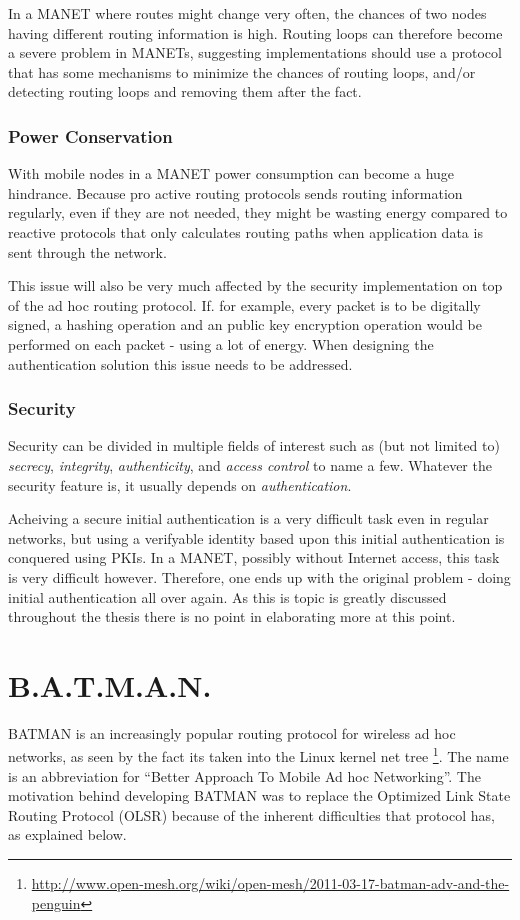 In a \ac{MANET} where routes might change very often, the chances of two nodes
having different routing information is high. Routing loops can therefore become
a severe problem in \acp{MANET}, suggesting implementations should use a
protocol that has some mechanisms to minimize the chances of routing loops,
and/or detecting routing loops and removing them after the fact.

\subsubsection*{Power Conservation}
With mobile nodes in a \ac{MANET} power consumption can become a huge hindrance.
Because pro active routing protocols sends routing information regularly, even
if they are not needed, they might be wasting energy compared to reactive
protocols that only calculates routing paths when application data is sent
through the network.

This issue will also be very much affected by the security implementation on top
of the ad hoc routing protocol. If. for example, every packet is to be digitally
signed, a hashing operation and an public key encryption operation would be
performed on each packet - using a lot of energy. When designing the
authentication solution this issue needs to be addressed.

\subsubsection*{Security}
Security can be divided in multiple fields of interest such as (but not limited
to) \textit{secrecy}, \textit{integrity}, \textit{authenticity}, and
\textit{access control} to name a few. Whatever the security feature is, it
usually depends on \emph{authentication}.

Acheiving a secure initial authentication is a very difficult task even in
regular networks, but using a verifyable identity based upon this initial
authentication is conquered using \acp{PKI}. In a \ac{MANET}, possibly without
Internet access, this task is very difficult however. Therefore, one ends up
with the original problem - doing initial authentication all over again. As this
is topic is greatly discussed throughout the thesis there is no point in
elaborating more at this point.

\section{B.A.T.M.A.N.}
BATMAN \cite{batman_rfc} is an increasingly popular routing protocol for
wireless ad hoc networks, as seen by the fact its taken into the Linux kernel
net tree
\footnote{\url{http://www.open-mesh.org/wiki/open-mesh/2011-03-17-batman-adv-and-the-penguin}}.
The name is an abbreviation for ``Better Approach To Mobile Ad hoc
Networking''. The motivation behind developing BATMAN was to replace the
Optimized Link State Routing Protocol (OLSR) \cite{why-starting-batman} because
of the inherent difficulties that protocol has, as explained below.

